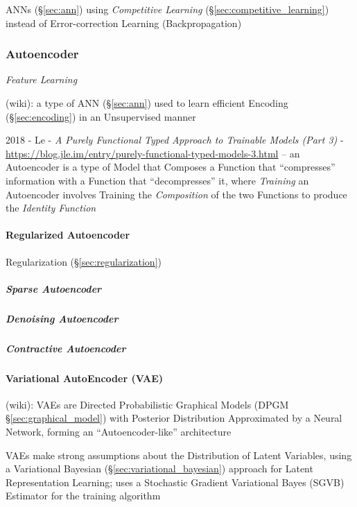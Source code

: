 ANNs (\S\ref{sec:ann}) using \emph{Competitive Learning}
(\S\ref{sec:competitive_learning}) instead of Error-correction Learning
(Backpropagation)



\subsubsection{Autoencoder}\label{sec:autoencoder}

\emph{Feature Learning}

(wiki): a type of ANN (\S\ref{sec:ann}) used to learn efficient Encoding
(\S\ref{sec:encoding}) in an Unsupervised manner

2018 - Le -
\emph{A Purely Functional Typed Approach to Trainable Models (Part 3)} -
\url{https://blog.jle.im/entry/purely-functional-typed-models-3.html}
--
an Autoencoder is a type of Model that Composes a Function that ``compresses''
information with a Function that ``decompresses'' it, where \emph{Training} an
Autoencoder involves Training the \emph{Composition} of the two Functions to
produce the \emph{Identity Function}



\paragraph{Regularized Autoencoder}\label{sec:regularized_autoencoder}\hfill

\fist Regularization (\S\ref{sec:regularization})



\subparagraph{Sparse Autoencoder}\label{sec:sparse_autoencoder}\hfill

\subparagraph{Denoising Autoencoder}\label{sec:denoising_autoencoder}\hfill

\subparagraph{Contractive Autoencoder}\label{sec:contractive_autoencoder}\hfill



\paragraph{Variational AutoEncoder (VAE)}\label{sec:vae}\hfill

(wiki): VAEs are Directed Probabilistic Graphical Models (DPGM
\S\ref{sec:graphical_model}) with Posterior Distribution Approximated by a
Neural Network, forming an ``Autoencoder-like'' architecture

VAEs make strong assumptions about the Distribution of Latent Variables, using a
Variational Bayesian (\S\ref{sec:variational_bayesian}) approach for Latent
Representation Learning; uses a Stochastic Gradient Variational Bayes (SGVB)
Estimator for the training algorithm

